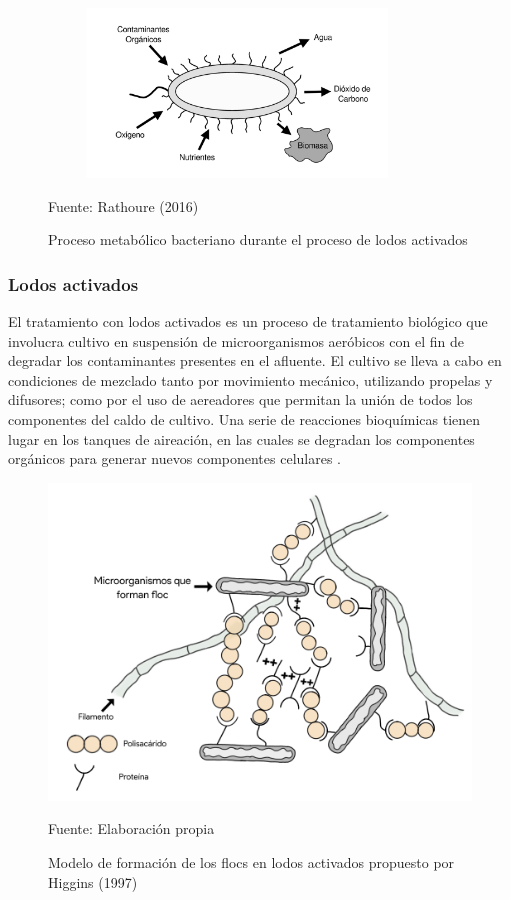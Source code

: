 	\begin{figure}[h]
		\centering
		\includegraphics[height=4.5cm,width=10cm]{Bacteria_rol.png}
		\caption{Proceso metabólico bacteriano durante el proceso de lodos activados}
		\small{Fuente: Rathoure (2016)}
		\label{fig:rolbacteria}
	\end{figure}

\subsubsection*{Lodos activados}
El tratamiento con lodos activados es un proceso de tratamiento biológico que involucra cultivo en suspensión de microorganismos aeróbicos con el fin de degradar los contaminantes presentes en el afluente. El cultivo se lleva a cabo en condiciones de mezclado tanto por movimiento mecánico, utilizando propelas y difusores; como por el uso de aereadores que permitan la unión de todos los componentes del caldo de cultivo. Una serie de reacciones bioquímicas tienen lugar en los tanques de aireación, en las cuales se degradan los componentes orgánicos para generar nuevos componentes celulares \citep{ashok16}.\par
	\begin{figure}[h]
		\centering
		\includegraphics[scale=0.25]{Floculo.png}
		\caption{Modelo de formación de los flocs en lodos activados propuesto por Higgins (1997)}
		\small{Fuente: Elaboración propia}
		\label{fig:modfloc}
	\end{figure}
